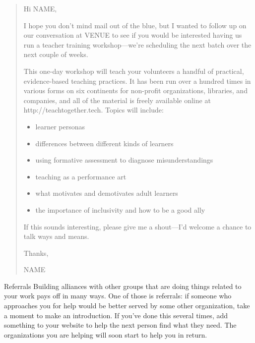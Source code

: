 \begin{quote}

  \noindent
  Hi NAME,

  I hope you don't mind mail out of the blue,
  but I wanted to follow up on our conversation at VENUE
  to see if you would be interested having us run a teacher training workshop---we're
  scheduling the next batch over the next couple of weeks.

  This one-day workshop will teach your volunteers
  a handful of practical, evidence-based teaching practices.
  It has been run over a hundred times in various forms on six continents
  for non-profit organizations, libraries, and companies,
  and all of the material is freely available online at http://teachtogether.tech.
  Topics will include:

  \begin{itemize}
  \item learner personas
  \item differences between different kinds of learners
  \item using formative assessment to diagnose misunderstandings
  \item teaching as a performance art
  \item what motivates and demotivates adult learners
  \item the importance of inclusivity and how to be a good ally
  \end{itemize}
  
  If this sounds interesting,
  please give me a shout---I'd welcome a chance to talk ways and means.

  Thanks,

  NAME

\end{quote}

\begin{aside}{Referrals}
  Building alliances with other groups that are doing things related to your work
  pays off in many ways.
  One of those is referrals:
  if someone who approaches you for help would be better served by some other organization,
  take a moment to make an introduction.
  If you've done this several times,
  add something to your website to help the next person find what they need.
  The organizations you are helping will soon start to help you in return.
\end{aside}


